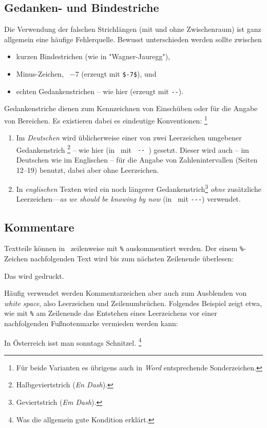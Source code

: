 \subsection{Gedanken- und Bindestriche}
\label{sec:gedankenstrich}

Die Verwendung der falschen Strichlängen (mit und ohne Zwischenraum) ist ganz
allgemein eine häufige Fehlerquelle. Bewusst unterschieden werden sollte
zwischen
%
\begin{itemize}
    \item kurzen Bindestrichen (wie in "Wagner-Jauregg"), %
    \item Minus-Zeichen, \zB\ $-7$ (erzeugt mit \verb!$-7$!), und %
    \item echten Gedankenstrichen -- wie hier (erzeugt mit \verb!--!).
\end{itemize}
%
\noindent
Gedankenstriche dienen zum Kennzeichnen von Einschüben oder für die Angabe von
Bereichen. Es existieren dabei es eindeutige Konventionen:%
\footnote{Für beide Varianten es übrigens auch in \emph{Word} entsprechende
Sonderzeichen.}
%
\begin{enumerate}
    \item Im \emph{Deutschen} wird üblicherweise einer von zwei
    Leerzeichen umgebener Gedankenstrich%
    \footnote{Halbgeviertstrich (\emph{En Dash}).} -- wie hier (in \latex\ mit
	{\verb*! -- !}) gesetzt. Dieser wird auch -- im Deutschen wie im Englischen
	-- für die Angabe von Zahlenintervallen (Seiten 12--19) benutzt, dabei aber
	ohne Leerzeichen.
%
    \item In \emph{englischen} Texten wird ein noch längerer
    Gedankenstrich\footnote{Geviertstrich (\emph{Em Dash}).} \emph{ohne}
    zusätzliche Leerzeichen---\emph{as we should be knowing by now}
    (in \latex\ mit {\verb*!---!}) verwendet.
%
\end{enumerate}

\subsection{Kommentare}
\label{sec:kommentare}


Textteile können in \latex\ zeilenweise mit \verb!%! auskommentiert werden.
Der einem \verb!%!-Zeichen nachfolgenden Text wird bis zum nächsten
Zeilenende überlesen:
%
\begin{LaTeXCode}[numbers=none]
Das wird gedruckt. %
\end{LaTeXCode}
%
Häufig verwendet werden Kommentarzeichen aber auch zum Ausblenden von
\emph{white space}, also Leerzeichen und Zeilenumbrüchen. Folgendes Beispiel
zeigt etwa, wie mit \verb!%! am Zeilenende das Entstehen eines Leerzeichens
vor einer nachfolgenden Fußnotenmarke vermieden werden kann:
%
\begin{LaTeXCode}[numbers=none]
In Österreich isst man sonntags Schnitzel.%
\footnote{Was die allgemein gute Kondition erklärt.}
\end{LaTeXCode}
%

